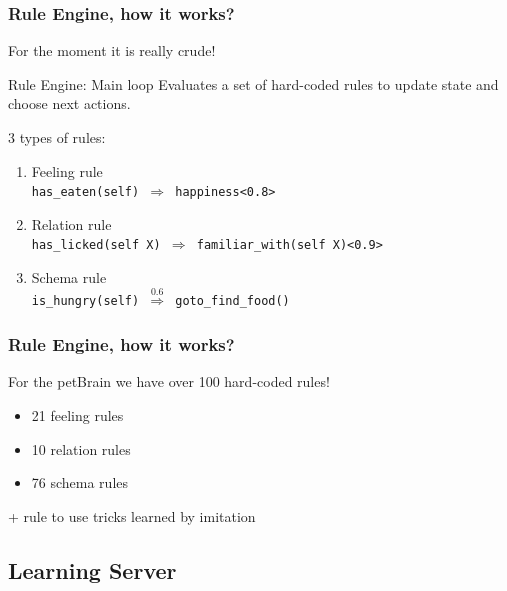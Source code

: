 \documentclass{beamer}
\begin{document}
\frame
{
  \frametitle{Rule Engine, how it works?}

  For the moment it is really crude!

  \begin{beamerboxesrounded}{Rule Engine: Main loop}
    Evaluates a set of hard-coded rules to update state and
    choose next actions.\\
    
    \pause
    
    3 types of rules:
    \begin{enumerate}
    \item<+-> Feeling rule\\
      {\footnotesize
      {\tt has\_eaten(self) $\Rightarrow$ happiness<0.8>}\\
      }
    \item<+-> Relation rule\\
      {\footnotesize
      {\tt has\_licked(self X) $\Rightarrow$ familiar\_with(self X)<0.9>}\\
      }
    \item<+-> Schema rule\\
      {\footnotesize
      {\tt is\_hungry(self) $\overset{0.6}{\Rightarrow}$ goto\_find\_food()}\\
      }
    \end{enumerate}
  \end{beamerboxesrounded}
}

\frame
{
  \frametitle{Rule Engine, how it works?}
  
  For the petBrain we have \alert{over 100 hard-coded rules!}
  \begin{itemize}
  \item 21 feeling rules
  \item 10 relation rules
  \item 76 schema rules
  \end{itemize}

  \alert{+ rule to use tricks learned by imitation}
}

\subsection{Learning Server}
\end{document}
